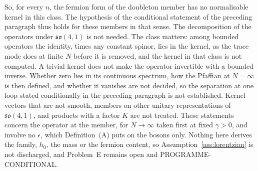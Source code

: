 So, for every \(n\), the fermion form of the doubleton member has no normalisable kernel in this class. The hypothesis of the conditional statement of the preceding paragraph thus holds for these members in that sense. The decomposition of the operators under \(\mathfrak{so}(4,1)\) is not needed. The class matters: among bounded operators the identity, times any constant spinor, lies in the kernel, as the trace mode does at finite \(N\) before it is removed, and the kernel in that class is not computed. A trivial kernel does not make the operator invertible with a bounded inverse. Whether zero lies in its continuous spectrum, how the Pfaffian at \(N=\infty\) is then defined, and whether it vanishes are not decided, so the separation at one loop stated conditionally in the preceding paragraph is not established. Kernel vectors that are not smooth, members on other unitary representations of \(\mathfrak{so}(4,1)\), and products with a factor \(K\) are not treated. These statements concern the operator at the member, for \(N\to\infty\) taken first at fixed \(\gamma>0\), and involve no \(\epsilon\), which Definition~(A) puts on the bosons only. Nothing here derives the family, \(h_0\), the mass or the fermion content, so Assumption~\ref{ass:lorentzian} is not discharged, and Problem~E remains open and PROGRAMME-CONDITIONAL.
